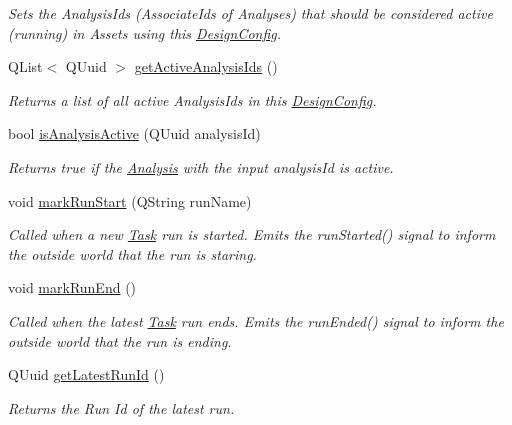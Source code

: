 \begin{DoxyCompactItemize}
\begin{DoxyCompactList}\small\item\em Sets the Analysis\-Ids (Associate\-Ids of Analyses) that should be considered active (running) in Assets using this \hyperlink{class_picto_1_1_design_config}{Design\-Config}. \end{DoxyCompactList}\item 
Q\-List$<$ Q\-Uuid $>$ \hyperlink{class_picto_1_1_design_config_ab29d63f3031f10aaf6d492fcbbf7ffc2}{get\-Active\-Analysis\-Ids} ()
\begin{DoxyCompactList}\small\item\em Returns a list of all active Analysis\-Ids in this \hyperlink{class_picto_1_1_design_config}{Design\-Config}. \end{DoxyCompactList}\item 
bool \hyperlink{class_picto_1_1_design_config_a65c9b3854491c6b7af8f39ac88b4847d}{is\-Analysis\-Active} (Q\-Uuid analysis\-Id)
\begin{DoxyCompactList}\small\item\em Returns true if the \hyperlink{class_picto_1_1_analysis}{Analysis} with the input analysis\-Id is active. \end{DoxyCompactList}\item 
void \hyperlink{class_picto_1_1_design_config_adb44d351d33d3c21e62268812abf9a03}{mark\-Run\-Start} (Q\-String run\-Name)
\begin{DoxyCompactList}\small\item\em Called when a new \hyperlink{class_picto_1_1_task}{Task} run is started. Emits the run\-Started() signal to inform the outside world that the run is staring. \end{DoxyCompactList}\item 
void \hyperlink{class_picto_1_1_design_config_a1dadb1b0f753339585f5a4959b913fac}{mark\-Run\-End} ()
\begin{DoxyCompactList}\small\item\em Called when the latest \hyperlink{class_picto_1_1_task}{Task} run ends. Emits the run\-Ended() signal to inform the outside world that the run is ending. \end{DoxyCompactList}\item 
Q\-Uuid \hyperlink{class_picto_1_1_design_config_aa0a107bae8dbf3373dc4f07bd955e50f}{get\-Latest\-Run\-Id} ()
\begin{DoxyCompactList}\small\item\em Returns the Run Id of the latest run. \end{DoxyCompactList}\item 

\end{DoxyCompactItemize}

